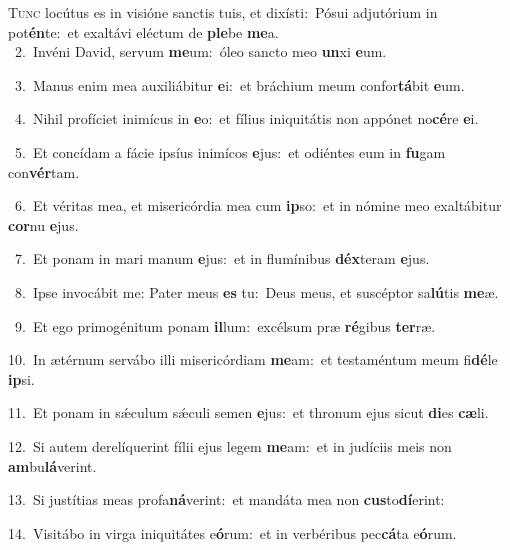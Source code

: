 \lettrine{\initial\textcolor{\initialcolor}{T}}{unc} locútus es in visióne sanctis tuis, et dixísti:~\dagger Pósui adjutórium in pot\-\textbf{én}\-te:~\star et exaltávi eléctum de \textbf{ple}\-be \textbf{me}\-a.\\
{\numbfont\textcolor{\numbcolor}{~2.}}~Invéni David, servum \textbf{me}\-um:~\star óleo sancto meo \textbf{un}\-xi \textbf{e}\-um.\par
{\numbfont\textcolor{\numbcolor}{~3.}}~Manus enim mea auxiliábitur \textbf{e}\-i:~\star et bráchium meum confor\-\textbf{tá}\-bit \textbf{e}\-um.\par
{\numbfont\textcolor{\numbcolor}{~4.}}~Nihil profíciet inimícus in \textbf{e}\-o:~\star et fílius iniquitátis non appónet no\-\textbf{cé}\-re \textbf{e}\-i.\par
{\numbfont\textcolor{\numbcolor}{~5.}}~Et concídam a fácie ipsíus inimícos \textbf{e}\-jus:~\star et odiéntes eum in \textbf{fu}\-gam con\-\textbf{vér}\-tam.\par
{\numbfont\textcolor{\numbcolor}{~6.}}~Et véritas mea, et misericórdia mea cum \textbf{ip}\-so:~\star et in nómine meo exaltábitur \textbf{cor}\-nu \textbf{e}\-jus.\par
{\numbfont\textcolor{\numbcolor}{~7.}}~Et ponam in mari manum \textbf{e}\-jus:~\star et in flumínibus \textbf{déx}\-teram \textbf{e}\-jus.\par
{\numbfont\textcolor{\numbcolor}{~8.}}~Ipse invocábit me: Pater meus \textbf{es} tu:~\star Deus meus, et suscéptor sa\-\textbf{lú}\-tis \textbf{me}\-æ.\par
{\numbfont\textcolor{\numbcolor}{~9.}}~Et ego primogénitum ponam \textbf{il}\-lum:~\star excélsum præ \textbf{ré}\-gibus \textbf{ter}\-ræ.\par
{\numbfont\textcolor{\numbcolor}{10.}}~In ætérnum servábo illi misericórdiam \textbf{me}\-am:~\star et testaméntum meum fi\-\textbf{dé}\-le \textbf{ip}\-si.\par
{\numbfont\textcolor{\numbcolor}{11.}}~Et ponam in sǽculum sǽculi semen \textbf{e}\-jus:~\star et thronum ejus sicut \textbf{di}\-es \textbf{cæ}\-li.\par
{\numbfont\textcolor{\numbcolor}{12.}}~Si autem derelíquerint fílii ejus legem \textbf{me}\-am:~\star et in judíciis meis non \textbf{am}\-bu\-\textbf{lá}\-verint.\par
{\numbfont\textcolor{\numbcolor}{13.}}~Si justítias meas profa\-\textbf{ná}\-verint:~\star et mandáta mea non \textbf{cus}\-to\-\textbf{dí}\-erint:\par
{\numbfont\textcolor{\numbcolor}{14.}}~Visitábo in virga iniquitátes e\-\textbf{ó}\-rum:~\star et in verbéribus pec\-\textbf{cá}\-ta e\-\textbf{ó}\-rum.\par
